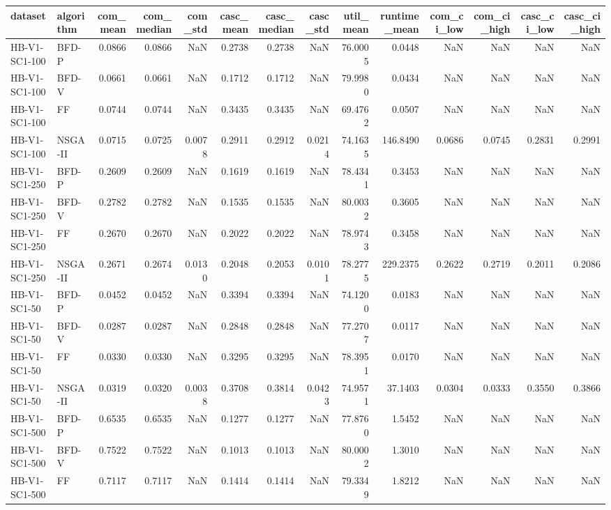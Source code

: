 \begin{tabular}{llrrrrrrrrrrrr}
\toprule
dataset & algorithm & com_mean & com_median & com_std & casc_mean & casc_median & casc_std & util_mean & runtime_mean & com_ci_low & com_ci_high & casc_ci_low & casc_ci_high \\
\midrule
HB-V1-SC1-100 & BFD-P & 0.0866 & 0.0866 & NaN & 0.2738 & 0.2738 & NaN & 76.0005 & 0.0448 & NaN & NaN & NaN & NaN \\
HB-V1-SC1-100 & BFD-V & 0.0661 & 0.0661 & NaN & 0.1712 & 0.1712 & NaN & 79.9980 & 0.0434 & NaN & NaN & NaN & NaN \\
HB-V1-SC1-100 & FF & 0.0744 & 0.0744 & NaN & 0.3435 & 0.3435 & NaN & 69.4762 & 0.0507 & NaN & NaN & NaN & NaN \\
HB-V1-SC1-100 & NSGA-II & 0.0715 & 0.0725 & 0.0078 & 0.2911 & 0.2912 & 0.0214 & 74.1635 & 146.8490 & 0.0686 & 0.0745 & 0.2831 & 0.2991 \\
HB-V1-SC1-250 & BFD-P & 0.2609 & 0.2609 & NaN & 0.1619 & 0.1619 & NaN & 78.4341 & 0.3453 & NaN & NaN & NaN & NaN \\
HB-V1-SC1-250 & BFD-V & 0.2782 & 0.2782 & NaN & 0.1535 & 0.1535 & NaN & 80.0032 & 0.3605 & NaN & NaN & NaN & NaN \\
HB-V1-SC1-250 & FF & 0.2670 & 0.2670 & NaN & 0.2022 & 0.2022 & NaN & 78.9743 & 0.3458 & NaN & NaN & NaN & NaN \\
HB-V1-SC1-250 & NSGA-II & 0.2671 & 0.2674 & 0.0130 & 0.2048 & 0.2053 & 0.0101 & 78.2775 & 229.2375 & 0.2622 & 0.2719 & 0.2011 & 0.2086 \\
HB-V1-SC1-50 & BFD-P & 0.0452 & 0.0452 & NaN & 0.3394 & 0.3394 & NaN & 74.1200 & 0.0183 & NaN & NaN & NaN & NaN \\
HB-V1-SC1-50 & BFD-V & 0.0287 & 0.0287 & NaN & 0.2848 & 0.2848 & NaN & 77.2707 & 0.0117 & NaN & NaN & NaN & NaN \\
HB-V1-SC1-50 & FF & 0.0330 & 0.0330 & NaN & 0.3295 & 0.3295 & NaN & 78.3951 & 0.0170 & NaN & NaN & NaN & NaN \\
HB-V1-SC1-50 & NSGA-II & 0.0319 & 0.0320 & 0.0038 & 0.3708 & 0.3814 & 0.0423 & 74.9571 & 37.1403 & 0.0304 & 0.0333 & 0.3550 & 0.3866 \\
HB-V1-SC1-500 & BFD-P & 0.6535 & 0.6535 & NaN & 0.1277 & 0.1277 & NaN & 77.8760 & 1.5452 & NaN & NaN & NaN & NaN \\
HB-V1-SC1-500 & BFD-V & 0.7522 & 0.7522 & NaN & 0.1013 & 0.1013 & NaN & 80.0002 & 1.3010 & NaN & NaN & NaN & NaN \\
HB-V1-SC1-500 & FF & 0.7117 & 0.7117 & NaN & 0.1414 & 0.1414 & NaN & 79.3349 & 1.8212 & NaN & NaN & NaN & NaN \\

\end{tabular}
